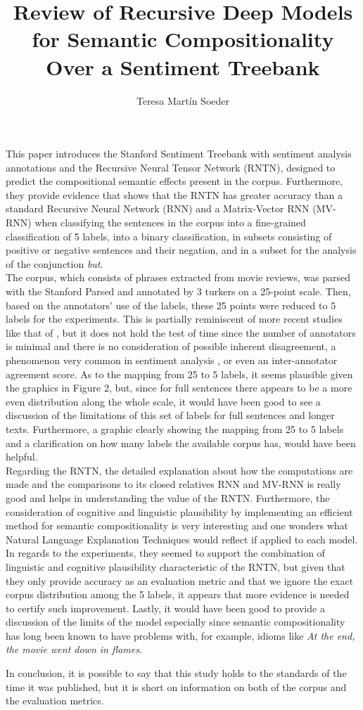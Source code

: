 \documentclass[11pt,a4paper]{article}
\title{Review of Recursive Deep Models for Semantic Compositionality Over a Sentiment Treebank \citep{socher2013recursive}}
\date{}
\author{Teresa Martín Soeder}
\begin{document}
\maketitle

This paper introduces the Stanford Sentiment Treebank with sentiment analysis annotations and the Recursive Neural Tensor Network (RNTN), designed to predict the compositional semantic effects present in the corpus. Furthermore, they provide evidence that shows that the RNTN has greater accuracy than a standard Recursive Neural Network (RNN) and a Matrix-Vector RNN (MV-RNN) when classifying the sentences in the corpus into a fine-grained classification of 5 labels, into a binary classification, in subsets consisting of positive or negative sentences and their negation, and in a subset for the analysis of the conjunction \textit{but}.\\

The corpus, which consists of phrases extracted from movie reviews, was parsed with the Stanford Parsed and annotated by 3 turkers on a 25-point scale. Then, based on the annotators' use of the labels, these 25 points were reduced to 5 labels for the experiments. This is partially reminiscent of more recent studies like that of \citet{pavlick2019inherent}, but it does not hold the test of time since the number of annotators is minimal and there is no consideration of possible inherent disagreement, a phenomenon very common in sentiment analysis \citep{uma2021learning}, or even an inter-annotator agreement score. As to the mapping from 25 to 5 labels, it seems plausible given the graphics in Figure 2, but, since for full sentences there appears to be a more even distribution along the whole scale, it would have been good to see a discussion of the limitations of this set of labels for full sentences and longer texts. Furthermore, a graphic clearly showing the mapping from 25 to 5 labels and a clarification on how many labels the available corpus has, would have been helpful.\\

Regarding the RNTN, the detailed explanation about how the computations are made and the comparisons to its closed relatives RNN and MV-RNN is really good and helps in understanding the value of the RNTN. Furthermore, the consideration of cognitive and linguistic plausibility by implementing an efficient method for semantic compositionality is very interesting and one wonders what Natural Language Explanation Techniques would reflect if applied to each model. In regards to the experiments, they seemed to support the combination of linguistic and cognitive plausibility characteristic of the RNTN, but given that they only provide accuracy as an evaluation metric and that we ignore the exact corpus distribution among the 5 labels, it appears that more evidence is needed to certify such improvement. Lastly, it would have been good to provide a discussion of the limits of the model especially since semantic compositionality has long been known to have problems with, for example, idioms like \textit{At the end, the movie went down in flames}. 

In conclusion, it is possible to say that this study holds to the standards of the time it was published, but it is short on information on both of the corpus and the evaluation metrics.

\nocite{*}


\end{document}
